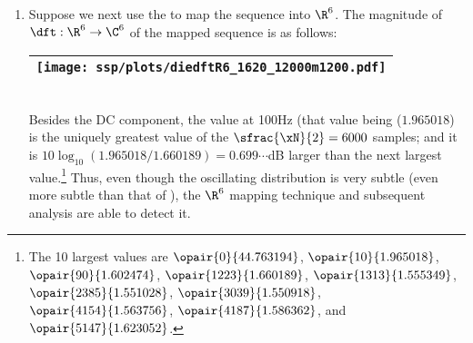 \begin{example}
\begin{enumerate}
  \item \label{item:nonstat34_12000m1200_R6}
    Suppose we next use the   to map
    the sequence into $\R^6$.
    The magnitude of $\dft:\R^6\to\C^6$ of the mapped sequence is as follows:
    \\\begin{tabular}{|>{\scs}c|}
         \hline
         \texttt{[image: ssp/plots/diedftR6\_1620\_12000m1200.pdf]}%
       \\\hline
    \end{tabular}\\
    Besides the DC component, the value at 100Hz (that value being ($1.965018$) 
    is the uniquely greatest value of the $\sfrac{\xN}{2}=6000$ samples;
    and it is $10\log_{10}(1.965018/1.660189)=0.699\cdots$dB larger than the next largest value.\footnote{
    The 10 largest values are
    $\opair{    0}{44.763194}$, $\opair{   10}{ 1.965018}$, $\opair{   90}{ 1.602474}$, $\opair{ 1223}{ 1.660189}$,
    $\opair{ 1313}{ 1.555349}$, $\opair{ 2385}{ 1.551028}$, $\opair{ 3039}{ 1.550918}$, $\opair{ 4154}{ 1.563756}$,
    $\opair{ 4187}{ 1.586362}$, and $\opair{ 5147}{ 1.623052}$.}
    Thus, even though the oscillating distribution is very subtle
    (even more subtle than that of ), the $\R^6$ mapping technique and subsequent analysis
    are able to detect it.
\end{enumerate}
\end{example}

